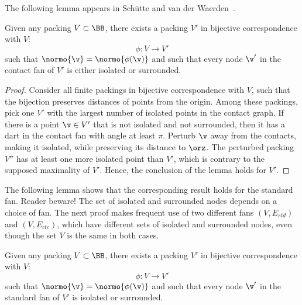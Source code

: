 The following lemma appears in Sch\"utte and van der
Waerden~\cite{vanderWaerden:1951}.

\begin{lemma}[]
Given any packing $V\subset \BB$,
there exists a  packing $V'$ 
in bijective correspondence with $V$:
\begin{displaymath}
\phi:V\to V'
\end{displaymath}
such that $\normo{\v} = \normo{\phi(\v)}$ and
such that every node $\v'$ in the contact fan of $V'$
is either isolated or surrounded.
\end{lemma}
%
%
%

\begin{proof} Consider all finite packings in bijective correspondence
  with $V$, such that the bijection preserves distances of points from
  the origin.  Among these packings, pick one $V'$ with the largest
  number of isolated points in the contact graph.  If there is a point
  $\v\in V'$ that is not isolated and not surrounded, then it has a
  dart in the contact fan with angle at least $\pi$.  Perturb $\v$ away from the
  contacts, making it isolated, while preserving its distance to
  $\orz$.  The perturbed packing $V''$ has at least one more isolated point
  than $V'$, which is contrary to the supposed maximality of $V'$.
  Hence, the conclusion of the lemma holds for $V'$.
\end{proof}

The following lemma shows that the corresponding result holds for the
standard fan.  Reader beware!  The set of isolated and surrounded
nodes depends on a choice of fan.  The next proof makes frequent use
of two different fans $(V,E_{std})$ and $(V,E_{ctc})$, which have
different sets of isolated and surrounded nodes, even though the
set $V$ is the same in both cases.



\begin{lemma}[]
\label{lemma:surrounded}  %
Given any packing $V\subset \BB$,
there exists a  packing $V'$ 
in bijective correspondence with $V$:
\begin{displaymath}
\phi:V\to V'
\end{displaymath}
such that $\normo{\v} = \normo{\phi(\v)}$ and
such that every node $\v'$ in the standard fan of $V'$
is isolated or surrounded.
%
\end{lemma}


